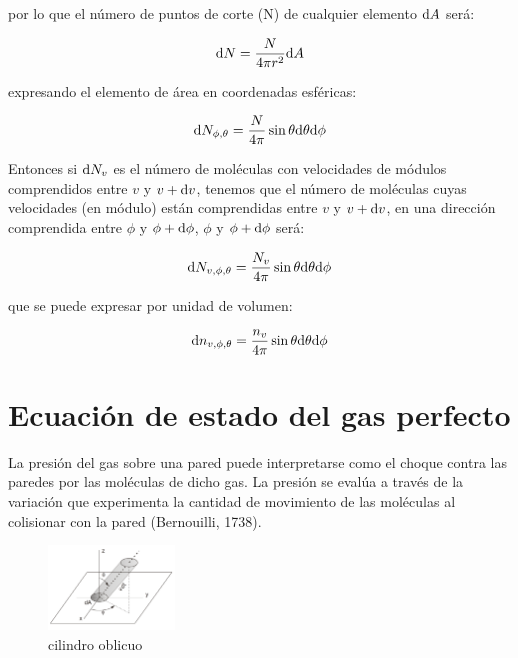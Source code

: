 \documentclass[12pt]{book}
\begin{document}
por lo que el número de puntos de corte (N) de cualquier elemento $\mathrm{d} A$ será:

\begin{equation}
\mathrm{d} N = \dfrac{N}{4 \pi r^2} \mathrm{d} A
\end{equation}

expresando el elemento de área en coordenadas esféricas:

\begin{equation}
\mathrm{d} N_{\phi, \theta} = \dfrac{N}{4 \pi} \sin \theta \mathrm{d} \theta \mathrm{d} \phi
\end{equation}

Entonces si $\mathrm{d} N_v$ es el número de moléculas con velocidades de módulos comprendidos entre $v$ y $v + \mathrm{d} v$, tenemos que el número de moléculas cuyas velocidades (en módulo) están comprendidas entre $v$ y $v + \mathrm{d} v$, en una dirección comprendida entre $\phi$ y $\phi + \mathrm{d} \phi$, $\phi$ y $\phi +\mathrm{d} \phi$ será:


\begin{equation}
\mathrm{d} N_{v,\phi, \theta} = \dfrac{N_v}{4 \pi} \sin \theta \mathrm{d} \theta \mathrm{d} \phi
\end{equation}

que se puede expresar por unidad de volumen:

\begin{equation}
\mathrm{d} n_{v,\phi, \theta} = \dfrac{n_v}{4 \pi} \sin \theta \mathrm{d} \theta \mathrm{d} \phi
\end{equation}

\section{Ecuación de estado del gas perfecto}

La presión del gas sobre una pared puede interpretarse como el choque contra las paredes por las moléculas de dicho gas. La presión se evalúa a través de la variación que experimenta la cantidad de movimiento de las moléculas al colisionar con la pared (Bernouilli, 1738). \\


\begin{figure}
    \centering
    \includegraphics[width=0.30\textwidth]{cilindrooblicuo.png}
    \caption{cilindro oblicuo}
    \label{Fig:6.2-cilindro}
\end{figure}
\end{document}
